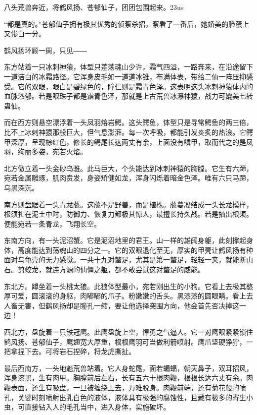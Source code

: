 
\begin{this_body}

八头荒兽奔近，将鹤风扬、苍郁仙子，团团包围起来。23us

“都是真的。”苍郁仙子拥有极其优秀的侦察杀招，察看了一番后，她娇美的脸蛋上又惨白一分。

鹤风扬环顾一周，只见――

东方站着一只冰刺神猿，体型只差荡魂山少许，霜气四溢，一路奔来，在沿途留下一道洁白的冰霜路径。它浑身皮毛如一道道冰锥，布满体表，带给二仙一阵压抑感受。它的双眼，眼白是碧绿色的，瞳仁则是霜青色泽。这表明这头冰刺神猿体内的血脉浓郁。若是眼珠子都是霜青色泽，那就是上古荒兽冰瀑神猿，战力可媲美七转蛊仙。

而在西方则悬空漂浮着一头凤羽熔岩鳄。这头鳄鱼，体型只是寻常鳄鱼的两三倍，比不上冰刺神猿那般巨大，但气息澎湃。每一次呼吸，都能引发炎炙的热浪。它鳄甲深厚，呈现棕红色，修长的鳄尾长达两丈有余，上面没有鳞甲，取而代之的是凤羽，绚丽多姿，宛若火焰。

北方傲立着一头金砂乌骓。此马巨大，个头能达到冰刺神猿的胸膛。它生有六蹄，宛若金属雕琢，肌肉贲发，身姿矫健如龙，浑身闪烁着暗金色泽。唯有六只马蹄，乌黑深沉。

南方则盘踞着一头青龙藤。这藤不是野兽，而是植株。藤蔓凝结成一头长龙模样，根须扎在泥土中时，防御力、恢复力都极其惊人，最擅长持久战。若是抽出根须。便能宛若一条青龙，飞翔长空。

东南方向，有一头泥沼蟹。它是泥沼地里的君王。山一样的雄阔身躯，此刻撑起身体，高度能达到荡魂山的四分之一。它的双眼退化至无，厚实的甲壳让鹤风扬有种面对乌龟壳的无力感觉。一共十九对螯足，尤其是第一螯足，轻轻一夹，就能断山石。剪蛟龙，就连方源的仙僵之躯，都不敢尝试这对螯足的威能。

东北方。蹲坐着一头桃太狼。此狼体型最小，宛若刚出生的小狗。它看上去极其憨厚可爱，圆滚滚的身躯，肉嘟嘟的爪子。粉嫩嫩的舌头。黑漆漆的圆眼睛。看上去人畜无害，但鹤风扬却是瞳孔一缩，要让他选择突围方向，他会首先否决掉这一边！

西北方，盘旋着一只铁冠鹰。此鹰盘旋上空，悍勇之气逼人。它一对鹰眼紧紧锁住鹤风扬、苍郁仙子，鹰翅宽大厚重，根根鹰羽可当做利箭喷射。鹰爪坚硬狰狞，一把拿捏下去。可将岩石捏碎，将龙虎撕扯。

最后西南方，一头地魁荒兽站着。它人身蛇尾，面若蝙蝠，朝天鼻子，双耳招风，浑身漆黑，生有肉甲。胸膛前后左右，长有五六十根肉鞭，根根长达六丈有余。肉鞭表面，还生有吸盘，一旦被缠绕上去，万难脱身。肉鞭前端，还有菊花般的喷孔，关键时刻喷射出乳白色的液体，液体具有极强的腐蚀性，且藏有极多的寄生小虫，可直接钻入人的毛孔当中，进入身体，实施破坏。


\end{this_body}
